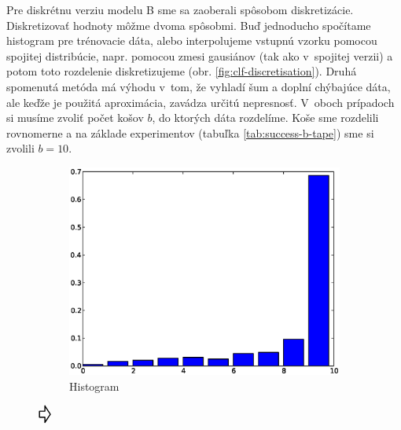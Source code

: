Pre diskrétnu verziu modelu B sme sa zaoberali spôsobom diskretizácie.
Diskretizovať hodnoty môžme dvoma spôsobmi. Buď jednoducho spočítame histogram pre trénovacie dáta, alebo interpolujeme vstupnú vzorku pomocou spojitej distribúcie, napr. pomocou zmesi gausiánov (tak ako v~spojitej verzii) a potom toto rozdelenie diskretizujeme (obr. \ref{fig:clf-discretisation}). Druhá spomenutá metóda má výhodu v~tom, že vyhladí šum a doplní chýbajúce dáta, ale keďže je použitá aproximácia, zavádza určitú nepresnosť.
V~oboch prípadoch si musíme zvoliť počet košov $b$, do ktorých dáta rozdelíme. Koše sme rozdelili rovnomerne a na základe experimentov (tabuľka \ref{tab:success-b-tape}) sme si zvolili $b = 10$.

\begin{figure}[htp]
        \centering
        \begin{subfigure}[c]{0.3\textwidth}
                \includegraphics[width=\textwidth]{images/hist1}
                \caption{Histogram}
                \label{fig:clf-discretisation-1}
        \end{subfigure}%
        $\vcenter{\hbox{\raisebox{.8cm}{\Huge\pointer}}}$
        \begin{subfigure}[c]{0.3\textwidth}

\end{subfigure}
\end{figure}
